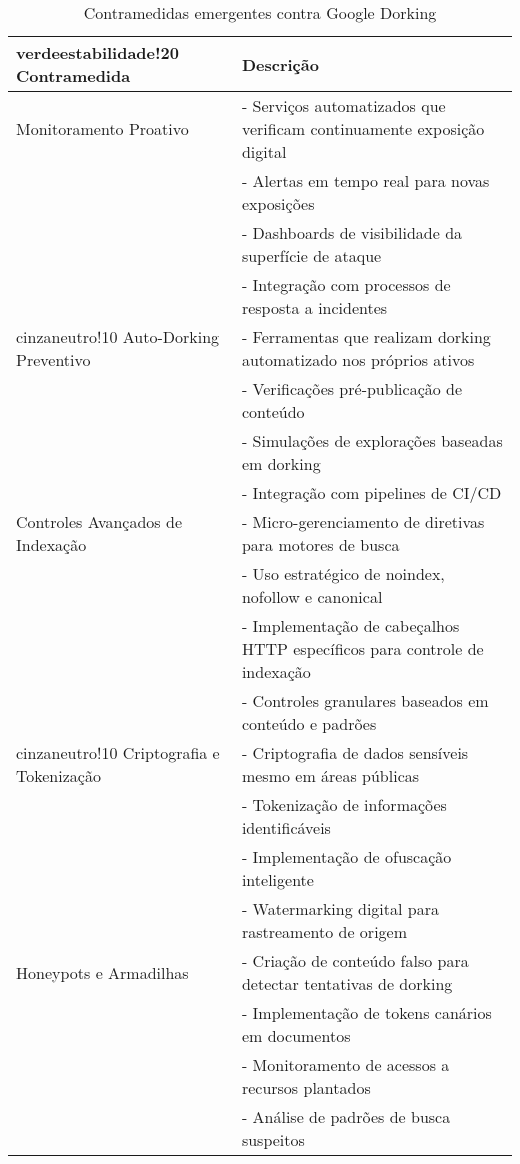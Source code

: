 \documentclass[12pt,a4paper]{book}
\begin{document}
\begin{table}[h]
\centering
\begin{tabular}{|p{4cm}|p{11cm}|}
\hline
{verdeestabilidade!20} \textbf{Contramedida} & \textbf{Descrição} \\
\hline
Monitoramento Proativo & - Serviços automatizados que verificam continuamente exposição digital \\
& - Alertas em tempo real para novas exposições \\
& - Dashboards de visibilidade da superfície de ataque \\
& - Integração com processos de resposta a incidentes \\
\hline
{cinzaneutro!10} Auto-Dorking Preventivo & - Ferramentas que realizam dorking automatizado nos próprios ativos \\
& - Verificações pré-publicação de conteúdo \\
& - Simulações de explorações baseadas em dorking \\
& - Integração com pipelines de CI/CD \\
\hline
Controles Avançados de Indexação & - Micro-gerenciamento de diretivas para motores de busca \\
& - Uso estratégico de noindex, nofollow e canonical \\
& - Implementação de cabeçalhos HTTP específicos para controle de indexação \\
& - Controles granulares baseados em conteúdo e padrões \\
\hline
{cinzaneutro!10} Criptografia e Tokenização & - Criptografia de dados sensíveis mesmo em áreas públicas \\
& - Tokenização de informações identificáveis \\
& - Implementação de ofuscação inteligente \\
& - Watermarking digital para rastreamento de origem \\
\hline
Honeypots e Armadilhas & - Criação de conteúdo falso para detectar tentativas de dorking \\
& - Implementação de tokens canários em documentos \\
& - Monitoramento de acessos a recursos plantados \\
& - Análise de padrões de busca suspeitos \\
\hline
\end{tabular}
\caption{Contramedidas emergentes contra Google Dorking}
\end{table}
\end{document}
